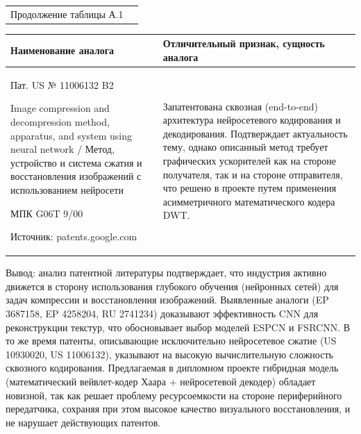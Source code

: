 \newpage

\noindent\begin{tabularx}{\textwidth}{@{}l X@{}}
Продолжение таблицы А.1
\end{tabularx}
\vspace{0.5em}

\noindent
\begin{tabularx}{\textwidth}{|p{}|X|}
\hline
\centering Наименование аналога & \centering\arraybackslash Отличительный признак, сущность аналога \\ \hline
Пат. US № 11006132 B2\par Image compression and decompression method, apparatus, and system using neural network / Метод, устройство и система сжатия и восстановления изображений с использованием нейросети\par МПК G06T 9/00\par Источник: patents.google.com &
Запатентована сквозная (end-to-end) архитектура нейросетевого кодирования и декодирования. Подтверждает актуальность тему, однако описанный метод требует графических ускорителей как на стороне получателя, так и на стороне отправителя, что решено в проекте путем применения асимметричного математического кодера DWT.
\\ \hline
\end{tabularx}

\vspace{1em}
Вывод: анализ патентной литературы подтверждает, что индустрия активно движется в сторону использования глубокого обучения (нейронных сетей) для задач компрессии и восстановления изображений. Выявленные аналоги (EP 3687158, EP 4258204, RU 2741234) доказывают эффективность CNN для реконструкции текстур, что обосновывает выбор моделей ESPCN и FSRCNN. В то же время патенты, описывающие исключительно нейросетевое сжатие (US 10930020, US 11006132), указывают на высокую вычислительную сложность сквозного кодирования. Предлагаемая в дипломном проекте гибридная модель (математический вейвлет-кодер Хаара + нейросетевой декодер) обладает новизной, так как решает проблему ресурсоемкости на стороне периферийного передатчика, сохраняя при этом высокое качество визуального восстановления, и не нарушает действующих патентов.

